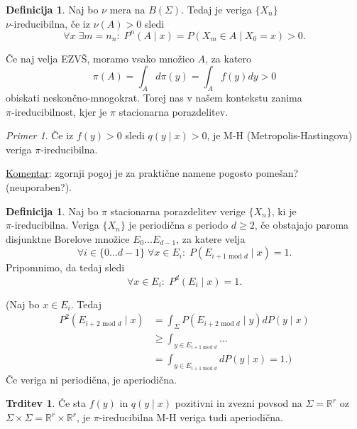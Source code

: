 \documentclass[a4paper, 12pt]{book}
\theoremstyle{definition}
\newtheorem{defn}[counter]{Definicija}
\newtheorem{claim}[counter]{Trditev}
\theoremstyle{remark}
\newtheorem*{ex}{Primer}
\newcommand{\R}{\mathbb{R}}
\begin{document}
\begin{defn}
  Naj bo $\nu$ mera na $B(\Sigma)$.
  Tedaj je veriga $\{X_n\}$ \\
  $\nu$-ireducibilna, če iz $\nu(A) > 0$ sledi
  \begin{equation*}
    \forall x \; \exists m = n_n: \; P^n(A \mid x) = P(X_m \in A \mid X_0 = x) > 0.
  \end{equation*}
\end{defn}
Če naj velja EZVŠ, moramo vsako množico $A$, za katero
\begin{equation*}
  \pi(A) = \int_A d\pi(y) = \int_A f(y) dy > 0
\end{equation*}
obiskati neskončno-mnogokrat.
Torej nas v našem kontekstu zanima \\
$\pi$-ireducibilnost, kjer je $\pi$ stacionarna porazdelitev.
\begin{ex}
  Če iz $f(y) > 0$ sledi $q(y \mid x) > 0$, je M-H (Metropolis-Hastingova) veriga $\pi$-ireducibilna.
\end{ex}
\underline{Komentar}: zgornji pogoj je za praktične namene pogosto pomešan? (neuporaben?).
\begin{defn}
  Naj bo $\pi$ stacionarna porazdelitev verige $\{X_n\}$, ki je \\
  $\pi$-ireducibilna.
  Veriga $\{X_n\}$ je periodična s periodo $d \geq 2$, če obstajajo paroma disjunktne Borelove množice $E_0 \dots E_{d-1}$,
  za katere velja
  \begin{equation*}
    \forall i \in \{0 \dots d-1\} \; \forall x \in E_i: \; P({E_{i+1 \text{ mod } d}} \mid x) = 1.
  \end{equation*}
  Pripomnimo, da tedaj sledi
  \begin{equation*}
    \forall x \in E_i: \; P^d(E_i \mid x) = 1.
  \end{equation*}
\end{defn}
(Naj bo $x \in E_i$.
Tedaj
\begin{align*}
  P^2(E_{i+2 \text{ mod } d} \mid x) &= \int_{\Sigma} P(E_{i+2 \text{ mod } d} \mid y) dP(y \mid x) \\
  &\geq \int_{y \in E_{i+1 \text{ mod }    d}} \dots \\
  &= \int_{y \in E_{i+1 \text{ mod } d}} dP(y \mid x) = 1.)
\end{align*}
Če veriga ni periodična, je aperiodična.
\begin{claim}
  Če sta $f(y)$ in $q(y \mid x)$ pozitivni in zvezni povsod na $\Sigma = \R^r$ oz $\Sigma \times \Sigma = \R^r \times \R^r$,
  je $\pi$-ireducibilna M-H veriga tudi aperiodična.
\end{claim}
\end{document}
